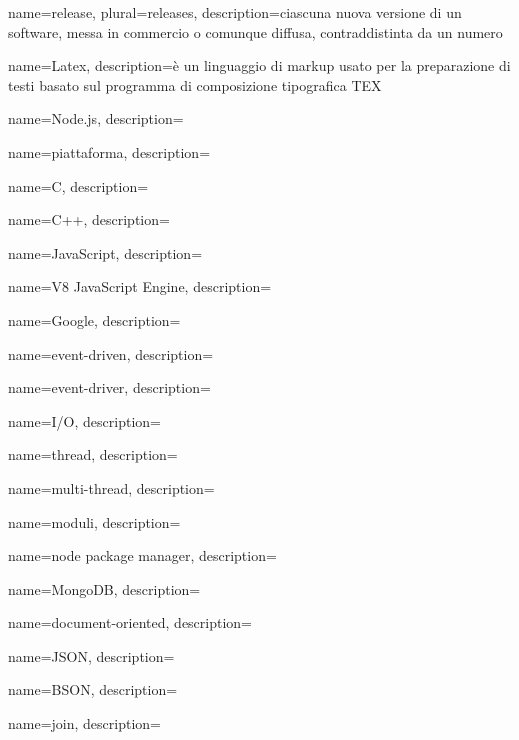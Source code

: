  {
    name=release,
    plural=releases,
    description={ciascuna nuova versione di un software, messa in commercio o comunque diffusa, contraddistinta da un numero}
}

 {
	name=Latex,
	description={è un linguaggio di markup usato per la preparazione di testi basato sul programma di composizione tipografica TEX}
}

 {
	name=Node.js,
	description={\TODO{}}
}

 {
	name=piattaforma,
	description={\TODO{}}
}

 {
	name=C,
	description={\TODO{}}
}

 {
	name=C++,
	description={\TODO{}}
}

 {
	name=JavaScript,
	description={\TODO{}}
}

 {
	name=V8 JavaScript Engine,
	description={\TODO{}}
}

 {
	name=Google,
	description={\TODO{}}
}

 {
	name=event-driven,
	description={\TODO{}}
}

 {
	name=event-driver,
	description={\TODO{}}
}

 {
	name=I/O,
	description={\TODO{}}
}

 {
	name=thread,
	description={\TODO{}}
}

 {
	name=multi-thread,
	description={\TODO{}}
}

 {
	name=moduli,
	description={\TODO{}}
}

 {
	name=node package manager,
	description={\TODO{}}
}

 {
	name=MongoDB,
	description={\TODO{}}
}

 {
	name=document-oriented,
	description={\TODO{}}
}

 {
	name=JSON,
	description={\TODO{}}
}

 {
	name=BSON,
	description={\TODO{}}
}

 {
	name=join,
	description={\TODO{}}
}

